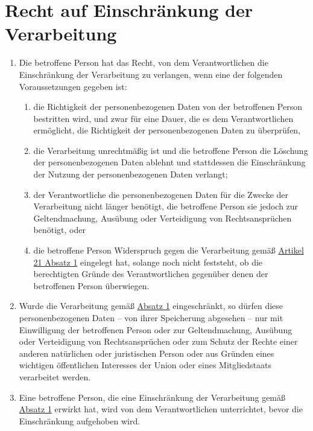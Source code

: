 \chapter{Recht auf Einschränkung der Verarbeitung}
\label{ch:18}


\begin{enumerate}

  \item Die betroffene Person hat das Recht, von dem Verantwortlichen die Einschränkung der Verarbeitung zu verlangen,
   wenn eine der folgenden Voraussetzungen gegeben ist:
  \label{itm:18-1}

  \begin{enumerate}
  
    \item die Richtigkeit der personenbezogenen Daten von der betroffenen Person bestritten wird, und zwar für eine
     Dauer, die es dem Verantwortlichen ermöglicht, die Richtigkeit der personenbezogenen Daten zu überprüfen,
    \label{itm:18-1a}

    \item die Verarbeitung unrechtmäßig ist und die betroffene Person die Löschung der personenbezogenen Daten ablehnt
     und stattdessen die Einschränkung der Nutzung der personenbezogenen Daten verlangt;
    \label{itm:18-1b}

    \item der Verantwortliche die personenbezogenen Daten für die Zwecke der Verarbeitung nicht länger benötigt, die
     betroffene Person sie jedoch zur Geltendmachung, Ausübung oder Verteidigung von Rechtsansprüchen benötigt, oder
    \label{itm:18-1c}

    \item die betroffene Person Widerspruch gegen die Verarbeitung gemäß \hyperref[itm:21-1]{Artikel 21 Absatz 1}
     eingelegt hat, solange noch nicht feststeht, ob die berechtigten Gründe des Verantwortlichen gegenüber denen der
     betroffenen Person überwiegen.
    \label{itm:18-1d}

  \end{enumerate}

  \item Wurde die Verarbeitung gemäß \hyperref[itm:18-1]{Absatz 1} eingeschränkt, so dürfen diese personenbezogenen Daten
   -- von ihrer Speicherung abgesehen -- nur mit Einwilligung der betroffenen Person oder zur Geltendmachung, Ausübung
   oder Verteidigung von Rechtsansprüchen oder zum Schutz der Rechte einer anderen natürlichen oder juristischen
   Person oder aus Gründen eines wichtigen öffentlichen Interesses der Union oder eines Mitgliedstaats verarbeitet
   werden.
  \label{itm:18-2}

  \item Eine betroffene Person, die eine Einschränkung der Verarbeitung gemäß \hyperref[itm:18-1]{Absatz 1} erwirkt hat,
   wird von dem Verantwortlichen unterrichtet, bevor die Einschränkung aufgehoben wird.
  \label{itm:18-3}

\end{enumerate}


